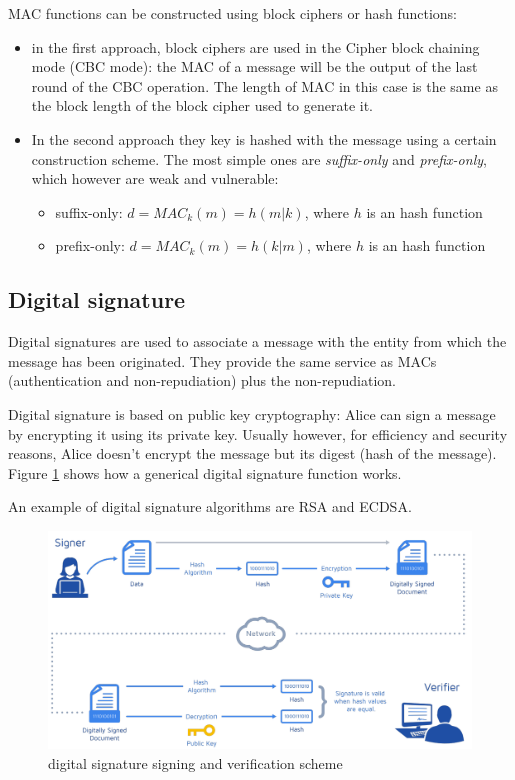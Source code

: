 MAC functions can be constructed using block ciphers or hash functions:
\begin{itemize}
  \item in the first approach, block ciphers are used in the Cipher block chaining mode (CBC mode):
  the MAC of a message will be the output of the last round of the CBC operation.
  The length of MAC in this case is the same as the block length of the block cipher
  used to generate it.
  \item In the second approach they key is hashed with the message using a certain
  construction scheme. The most simple ones are \emph{suffix-only} and
  \emph{prefix-only}, which however are weak and vulnerable:
  \begin{itemize}
    \item suffix-only: ${d=MAC_k(m)=h(m|k)}$, where $h$ is an hash function
    \item prefix-only: ${d=MAC_k(m)=h(k|m)}$, where $h$ is an hash function
  \end{itemize}
\end{itemize}





\subsection{Digital signature}
Digital signatures are used to associate a message with the entity from which the
message has been originated. They provide the same service as MACs (authentication
and non-repudiation) plus the non-repudiation.

Digital signature is based on public key cryptography: Alice can sign a message
by encrypting it using its private key. Usually however, for efficiency and security
reasons, Alice doesn't encrypt the message but its digest (hash of the message).
Figure \ref{fig:digital-signature} shows how a generical digital signature function
works.

An example of digital signature algorithms are RSA and ECDSA.

\begin{figure}[!htb]
	\centering
	\includegraphics[width=1\linewidth]{img/digital-signature.png}
	\caption{digital signature signing and verification scheme}
	\label{fig:digital-signature}
\end{figure}





